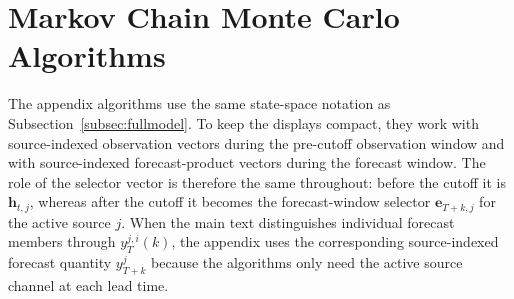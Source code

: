 \documentclass[APA,STIX1COL]{WileyNJD-v2}
\begin{document}
\section{Markov Chain Monte Carlo Algorithms}

The appendix algorithms use the same state-space notation as Subsection~\ref{subsec:fullmodel}. To keep the displays compact, they work with source-indexed observation vectors during the pre-cutoff observation window and with source-indexed forecast-product vectors during the forecast window. The role of the selector vector is therefore the same throughout: before the cutoff it is \(\mathbf{h}_{t,j}\), whereas after the cutoff it becomes the forecast-window selector \(\mathbf{e}_{T+k,j}\) for the active source \(j\). When the main text distinguishes individual forecast members through \(y_T^{j,i}(k)\), the appendix uses the corresponding source-indexed forecast quantity \(y_{T+k}^{j}\) because the algorithms only need the active source channel at each lead time.
\end{document}
